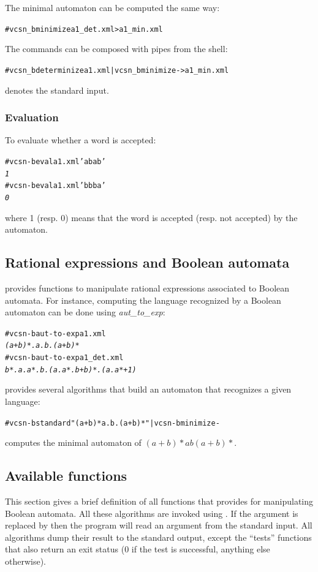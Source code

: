 The minimal automaton can be computed the same way:
\begin{alltt}
# vcsn_b minimize a1_det.xml > a1_min.xml
\end{alltt}
The commands can be composed with pipes from the shell:
\begin{alltt}
# vcsn_b determinize a1.xml | vcsn_b minimize - > a1_min.xml
\end{alltt}

\samp{-} denotes the standard input.

\subsubsection{Evaluation}

To evaluate whether a word is accepted:
\begin{alltt}
# vcsn-b eval a1.xml 'abab'
\textit{1}
# vcsn-b eval a1.xml 'bbba'
\textit{0}
\end{alltt}
where 1 (resp. 0) means that the word is accepted (resp. not accepted)
by the automaton.

\subsection{Rational expressions and Boolean automata}

\Vauc provides functions to manipulate rational expressions associated
to Boolean automata. For instance, computing the language recognized
by a Boolean automaton can be done using \textit{aut\_to\_exp}:
\begin{alltt}
# vcsn-b aut-to-exp a1.xml
\textit{(a+b)*.a.b.(a+b)*}
# vcsn-b aut-to-exp a1_det.xml
\textit{b*.a.a*.b.(a.a*.b+b)*.(a.a*+1)}
\end{alltt}

\Vauc provides several algorithms that build an automaton that
recognizes a given language:
\begin{alltt}
# vcsn-b standard "(a+b)*a.b.(a+b)*" | vcsn-b minimize -
\end{alltt}
computes the minimal automaton of $(a+b)*ab(a+b)*$.

\subsection{Available functions}
This section gives a brief definition of all functions that \Vauc
provides for manipulating Boolean automata.  All these algorithms are
invoked using . If
the argument is replaced by \samp{-} then the program will read an
argument from the standard input.  All algorithms dump their result to
the standard output, except the ``tests'' functions that also return
an exit status (0 if the test is successful, anything else otherwise).

